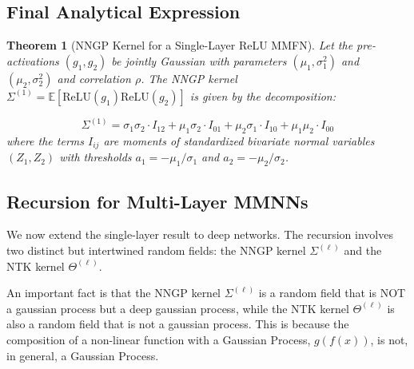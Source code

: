 \documentclass[a4paper]{article}
\theoremstyle{plain}
\newtheorem{theorem}{Theorem}[section]
\theoremstyle{definition}
\theoremstyle{remark}
\begin{document}
\subsection{Final Analytical Expression}
\begin{theorem}[NNGP Kernel for a Single-Layer ReLU MMFN]
Let the pre-activations $(g_1, g_2)$ be jointly Gaussian with parameters $(\mu_1, \sigma_1^2)$ and $(\mu_2, \sigma_2^2)$ and correlation $\rho$. The NNGP kernel $\Sigma^{(1)} = \mathbb{E}[\text{ReLU}(g_1)\text{ReLU}(g_2)]$ is given by the decomposition:

\begin{tcolorbox}[colback=blue!10,colframe=blue!80!black,title={\textbf{NNGP Kernel Decomposition}},enhanced,drop shadow,boxrule=2pt]
\begin{equation}
\label{eq:final_ntk_decomp}
\boxed{
\Sigma^{(1)} = \sigma_1\sigma_2 \cdot I_{12} + \mu_1\sigma_2 \cdot I_{01} + \mu_2\sigma_1 \cdot I_{10} + \mu_1\mu_2 \cdot I_{00}
}
\end{equation}
where the terms $I_{ij}$ are moments of standardized bivariate normal variables $(Z_1, Z_2)$ with thresholds $a_1 = -\mu_1/\sigma_1$ and $a_2 = -\mu_2/\sigma_2$.
\end{tcolorbox}
\end{theorem}















\subsection{Recursion for Multi-Layer MMNNs}
We now extend the single-layer result to deep networks. The recursion involves two distinct but intertwined random fields: the NNGP kernel $\Sigma^{(\ell)}$ and the NTK kernel $\Theta^{(\ell)}$.

\begin{tcolorbox}[colback=red!10,colframe=red!80!black,title={\textbf{Crucial Remark: Random Kernels in Deep Networks}},enhanced,drop shadow,boxrule=2pt]
An important fact is that the NNGP kernel $\Sigma^{(\ell)}$ is a random field that is NOT a gaussian process but a deep gaussian process, while the NTK kernel $\Theta^{(\ell)}$ is also a random field that is not a gaussian process. This is because the composition of a non-linear function with a Gaussian Process, $g(f(x))$, is not, in general, a Gaussian Process.
\end{tcolorbox}
\end{document}
